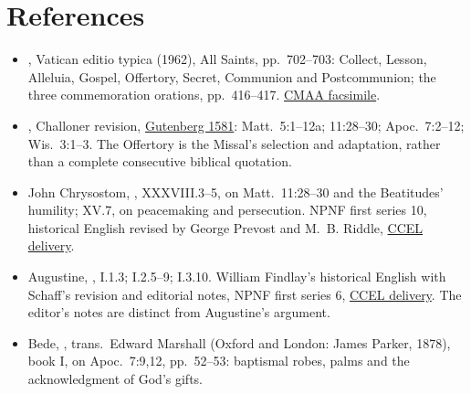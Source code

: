 \section{References}
\begin{itemize}
\item {}, Vatican editio typica (1962),
All Saints, pp.~702--703: Collect, Lesson, Alleluia, Gospel,
Offertory, Secret, Communion and Postcommunion; the three
commemoration orations, pp.~416--417.
\href{https://media.churchmusicassociation.org/pdf/missale62.pdf}{CMAA facsimile}.
\item {}, Challoner revision,
\href{https://www.gutenberg.org/ebooks/1581}{Gutenberg 1581}:
Matt.~5:1--12a; 11:28--30; Apoc.~7:2--12; Wis.~3:1--3.
The Offertory is the Missal's selection and adaptation, rather
than a complete consecutive biblical quotation.
\item John Chrysostom, ,
XXXVIII.3--5, on Matt.~11:28--30 and the Beatitudes' humility;
XV.7, on peacemaking and persecution. NPNF first series 10,
historical English revised by George Prevost and M.~B. Riddle,
\href{https://www.ccel.org/ccel/schaff/npnf110.html}{CCEL delivery}.
\item Augustine, ,
I.1.3; I.2.5--9; I.3.10. William Findlay's historical English
with Schaff's revision and editorial notes, NPNF first series 6,
\href{https://www.ccel.org/ccel/schaff/npnf106.html}{CCEL delivery}.
The editor's notes are distinct from Augustine's argument.
\item Bede, ,
trans.~Edward Marshall (Oxford and London: James Parker, 1878),
book I, on Apoc.~7:9,12, pp.~52--53: baptismal robes,
palms and the acknowledgment of God's gifts.
\end{itemize}
